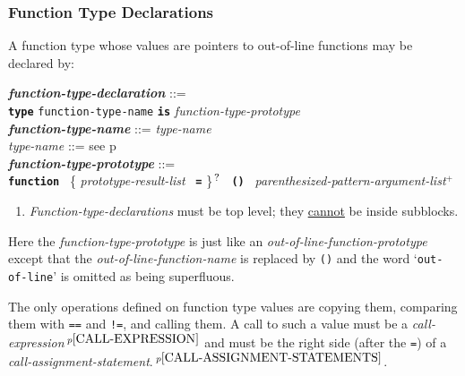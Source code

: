 \documentclass[12pt]{article}
\newcommand{\TT}[1]{{\tt \bfseries #1}}
\newcommand{\PLUS}[1][]{{$^{+#1}$}}
\newcommand{\QMARK}{{$^{\,\mbox{\footnotesize ?}}$}}
\newcommand{\ttkey}[1]{{\tt \bfseries #1}}
\newcommand{\emkey}[1]{{\em \bfseries #1}}
\newcommand{\pagref}[1]{p\pageref{#1}}
\newcommand{\pagnote}[1]{$\,^{p\pageref{#1}}$}
\newenvironment{indpar}[1][0.3in]%
	{\begin{list}{}%
		     {\setlength{\itemsep}{0in}%
		      \setlength{\topsep}{0in}%
		      \setlength{\parsep}{1ex}%
		      \setlength{\labelwidth}{#1}%
		      \setlength{\leftmargin}{#1}%
		      \addtolength{\leftmargin}{\labelsep}}%
	 \item}%
	{\end{list}}
\begin{document}
\subsubsection{Function Type Declarations}
\label{FUNCTION-TYPE-DECLARATIONS}

A function type whose values are pointers to out-of-line
functions may be declared by:

\begin{indpar}
\emkey{function-type-declaration}\label{FUNCTION-TYPE-DECLARATION} ::= \\
\hspace*{0.5in}
    \ttkey{type} {\tt function-type-name} \TT{is}
                 {\em function-type-prototype}
\\[0.5ex]
\emkey{function-type-name} ::= {\em type-name}
\\[0.5ex]
{\em type-name} ::= see \pagref{TYPE-NAME}
\\[0.5ex]
\emkey{function-type-prototype}%
	\label{FUNCTION-TYPE-PROTOTYPE} ::= \\
\hspace*{0.25in} \ttkey{function}~
        \{ {\em prototype-result-list}~ \TT{=} \}\QMARK{}~
	\TT{()}~ {\em parenthesized-pattern-argument-list}\PLUS{}
\begin{enumerate}
\item
{\em Function-type-declarations} must be top level; they
\underline{cannot} be inside subblocks.
\end{enumerate}
\end{indpar}

Here the {\em function-type-prototype} is just like an
{\em out-of-line-function-prototype} except that the
{\em out-of-line-function-name} is replaced by {\tt ()} and
the word `{\tt out-of-line}' is omitted as being superfluous.

The only operations defined on function type values are copying them,
comparing them with {\tt ==} and {\tt !=}, and
calling them.  A call to such a value must be a
{\em call-expression}\pagnote{CALL-EXPRESSION} and
must be the right side (after the {\tt =})
of a {\em call-assignment-state\-ment}.\pagnote{CALL-ASSIGNMENT-STATEMENTS}.
\end{document}

